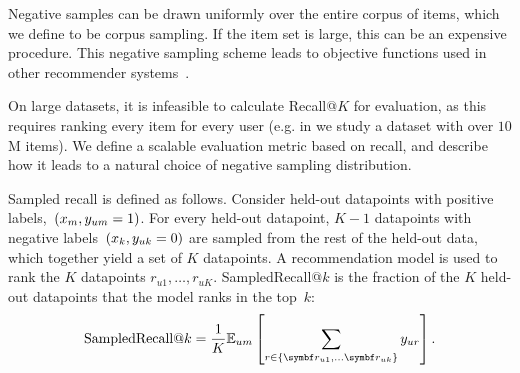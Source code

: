 

Negative samples can be drawn uniformly over the entire corpus of items, which we define to be corpus sampling. If the item set is large, this can be an expensive procedure. This negative sampling scheme leads to objective functions used in other recommender systems~\citep{he2017neural,song2018neural}.

On large datasets, it is infeasible to calculate Recall@$K$ for evaluation, as this requires ranking every item for every user (e.g. in  we study a dataset with over $10$M items). We define a scalable evaluation metric based on recall, and describe how it leads to a natural choice of negative sampling distribution.

Sampled recall is defined as follows. Consider held-out datapoints with positive labels,~${(x_m, y_{um} = 1)}$. For every held-out datapoint, $K-1$ datapoints with negative labels~${(x_k, y_{uk} = 0)}$ are sampled from the rest of the held-out data, which together yield a set of $K$ datapoints. A recommendation model is used to rank the $K$ datapoints $r_{u1}, \ldots, r_{uK}$. SampledRecall@$k$ is the fraction of the $K$ held-out datapoints that the model ranks in the top~$k$:
\begin{equation}
  \textrm{SampledRecall@}k = \frac{1}{K}{\E_{um}\left[\sum_{r\in
\{\mb{r}_{u1},
\ldots \mb{r}_{uk}\}} y_{ur}\right]}\, .
\label{eq:sampled-recall}
\end{equation}

